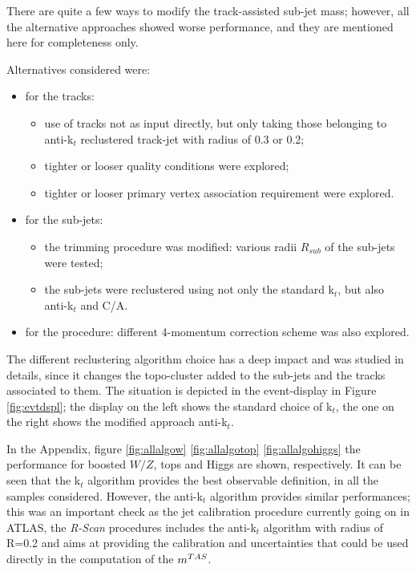 There are quite a few ways to modify the track-assisted sub-jet mass; however, all the alternative approaches showed worse performance, and they are mentioned here for completeness only.

Alternatives considered were: 
\begin{itemize}
 \item for the tracks:
 \begin{itemize}
   \item use of tracks not as input directly, but only taking those belonging to anti-k$_t$ reclustered track-jet with radius of 0.3 or 0.2;
   \item tighter or looser quality conditions were explored;
   \item tighter or looser primary vertex association requirement were explored.
 \end{itemize}
 \item for the sub-jets:
  \begin{itemize}
   \item the trimming procedure was modified: various radii $R_{sub}$ of the sub-jets were tested;
   \item the sub-jets were reclustered using not only the standard k$_t$, but also anti-k$_t$ and C/A.
  \end{itemize}
  \item for the procedure: different 4-momentum correction scheme was also explored.
\end{itemize}

The different reclustering algorithm choice has a deep impact and was studied in details, since it changes the topo-cluster added to the sub-jets and the tracks associated to them. The situation is depicted in the event-display in Figure \ref{fig:evtdspl}; the display on the left shows the standard choice of k$_t$, the one on the right shows the modified approach anti-k$_t$. 

In the Appendix, figure \ref{fig:allalgow} \ref{fig:allalgotop} \ref{fig:allalgohiggs} the performance for boosted $W/Z$, tops and Higgs are shown, respectively. It can be seen that the k$_t$ algorithm provides the best observable definition, in all the samples considered. However, the anti-k$_t$ algorithm provides similar performances; this was an important check as the jet calibration procedure currently going on in ATLAS, the \textit{R-Scan} procedures includes the anti-k$_t$ algorithm with radius of R=0.2 and aims at providing the calibration and uncertainties that could be used directly in the computation of the $m^{TAS}$.

